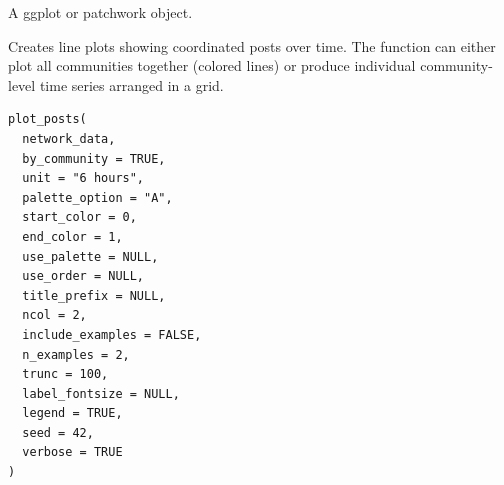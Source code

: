 \documentclass[a4paper]{book}
\begin{document}
%
\begin{Value}
A ggplot or patchwork object.
\end{Value}
%
\begin{Description}
Creates line plots showing coordinated posts over time. The function can
either plot all communities together (colored lines) or produce individual
community-level time series arranged in a grid.
\end{Description}
%
\begin{Usage}
\begin{verbatim}
plot_posts(
  network_data,
  by_community = TRUE,
  unit = "6 hours",
  palette_option = "A",
  start_color = 0,
  end_color = 1,
  use_palette = NULL,
  use_order = NULL,
  title_prefix = NULL,
  ncol = 2,
  include_examples = FALSE,
  n_examples = 2,
  trunc = 100,
  label_fontsize = NULL,
  legend = TRUE,
  seed = 42,
  verbose = TRUE
)
\end{verbatim}
\end{Usage}
%
\end{document}
